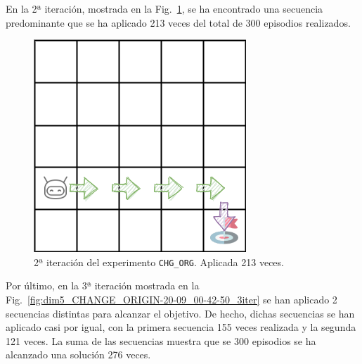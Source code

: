 En la 2ª iteración, mostrada en la Fig.~\ref{fig:dim5_CHANGE_ORIGIN-20-09_00-42-50_213}, se ha encontrado una secuencia predominante que se ha aplicado 213 veces del total de 300 episodios realizados. \\

\begin{figure}
    \centering
    \includegraphics[scale=0.4]{cap5_experimentacion/images/dim5_CHANGE_ORIGIN-20-09_00-42-50_213.png}
    \caption{2ª iteración del experimento \texttt{CHG\_ORG}. Aplicada 213 veces.}
    \label{fig:dim5_CHANGE_ORIGIN-20-09_00-42-50_213}
\end{figure}

Por último, en la 3ª iteración mostrada en la Fig.~\ref{fig:dim5_CHANGE_ORIGIN-20-09_00-42-50_3iter} se han aplicado 2 secuencias distintas para alcanzar el objetivo. De hecho, dichas secuencias se han aplicado casi por igual, con la primera secuencia 155 veces realizada y la segunda 121 veces. La suma de las secuencias muestra que se 300 episodios se ha alcanzado una solución 276 veces.
 
